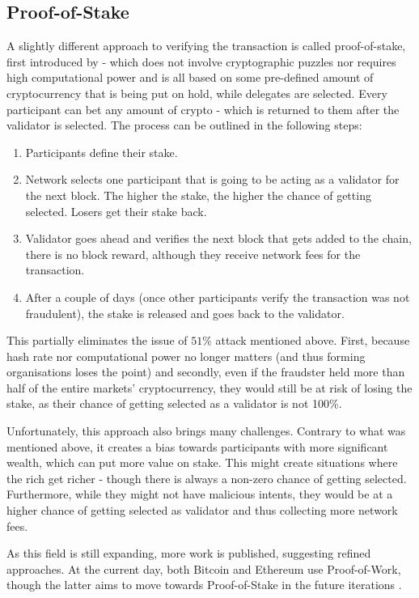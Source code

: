 \subsection{Proof-of-Stake}
A slightly different approach to verifying the transaction is called proof-of-stake, first introduced by \cite{king2012ppcoin} - which does not involve cryptographic puzzles nor requires high computational power and is all based on some pre-defined amount of cryptocurrency that is being put on hold, while delegates are selected. Every participant can bet any amount of crypto - which is returned to them after the validator is selected. The process can be outlined in the following steps:
\begin{enumerate}
    \item Participants define their stake.
    \item Network selects one participant that is going to be acting as a validator for the next block. The higher the stake, the higher the chance of getting selected. Losers get their stake back.
    \item Validator goes ahead and verifies the next block that gets added to the chain, there is no block reward, although they receive network fees for the transaction.
    \item After a couple of days (once other participants verify the transaction was not fraudulent), the stake is released and goes back to the validator.
\end{enumerate}
This partially eliminates the issue of $51\%$ attack mentioned above. First, because hash rate nor computational power no longer matters (and thus forming organisations loses the point) and secondly, even if the fraudster held more than half of the entire markets' cryptocurrency, they would still be at risk of losing the stake, as their chance of getting selected as a validator is not 100\%.

Unfortunately, this approach also brings many challenges. Contrary to what was mentioned above, it creates a bias towards participants with more significant wealth, which can put more value on stake. This might create situations where the rich get richer - though there is always a non-zero chance of getting selected. Furthermore, while they might not have malicious intents, they would be at a higher chance of getting selected as validator and thus collecting more network fees.

As this field is still expanding, more work is published, suggesting refined approaches. At the current day, both Bitcoin and Ethereum use Proof-of-Work, though the latter aims to move towards Proof-of-Stake in the future iterations \cite{saleh2020blockchain}.
